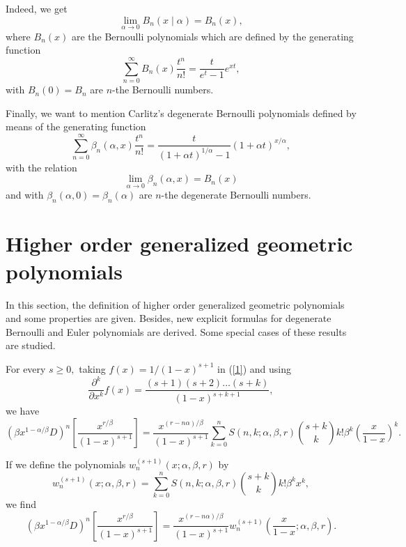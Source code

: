 \documentclass{article}%
\begin{document}
Indeed, we get%
\[
\underset{\alpha\rightarrow0}{\lim}B_{n}\left(  x\mid\alpha\right)
=B_{n}\left(  x\right)  ,
\]
where $B_{n}\left(  x\right)  $ are the Bernoulli polynomials which are
defined by the generating function%
\[
\sum_{n=0}^{\infty}B_{n}\left(  x\right)  \frac{t^{n}}{n!}=\frac{t}{e^{t}%
-1}e^{xt},
\]
with $B_{n}\left(  0\right)  =B_{n}$ are $n$-the Bernoulli numbers.

Finally, we want to mention Carlitz's degenerate Bernoulli polynomials defined
by means of the generating function \cite{Carlitz}%
\[
\sum_{n=0}^{\infty}\beta_{n}\left(  \alpha,x\right)  \frac{t^{n}}{n!}=\frac
{t}{\left(  1+\alpha t\right)  ^{1/\alpha}-1}\left(  1+\alpha t\right)
^{x/\alpha},
\]
with the relation
\[
\underset{\alpha\rightarrow0}{\lim}\beta_{n}\left(  \alpha,x\right)
=B_{n}\left(  x\right)
\]
and with $\beta_{n}\left(  \alpha,0\right)  =\beta_{n}\left(  \alpha\right)  $
are $n$-the degenerate Bernoulli numbers.

\section{Higher order generalized geometric polynomials}

In this section, the definition of higher order generalized geometric
polynomials and some properties are given. Besides, new explicit formulas for
degenerate Bernoulli and Euler polynomials are derived.\textbf{ }Some special
cases of these results are studied.

For every $s\geq0,$ taking $f\left(  x\right)  =1/\left(  1-x\right)  ^{s+1}$
in (\ref{1}) and using
\[
\frac{\partial^{k}}{\partial x^{k}}f\left(  x\right)  =\frac{\left(
s+1\right)  \left(  s+2\right)  \ldots\left(  s+k\right)  }{\left(
1-x\right)  ^{s+k+1}},
\]
we have
\[
\left(  \beta x^{1-\alpha/\beta}D\right)  ^{n}\left[  \frac{x^{r/\beta}%
}{\left(  1-x\right)  ^{s+1}}\right]  =\frac{x^{\left(  r-n\alpha\right)
/\beta}}{\left(  1-x\right)  ^{s+1}}\sum_{k=0}^{n}S\left(  n,k;\alpha
,\beta,r\right)  \binom{s+k}{k}k!\beta^{k}\left(  \frac{x}{1-x}\right)  ^{k}.
\]


If we define the polynomials $w_{n}^{\left(  s+1\right)  }\left(
x;\alpha,\beta,r\right)  $ by
\begin{equation}
w_{n}^{\left(  s+1\right)  }\left(  x;\alpha,\beta,r\right)  =\sum_{k=0}%
^{n}S\left(  n,k;\alpha,\beta,r\right)  \binom{s+k}{k}k!\beta^{k}x^{k},
\label{3}%
\end{equation}
we find
\begin{equation}
\left(  \beta x^{1-\alpha/\beta}D\right)  ^{n}\left[  \frac{x^{r/\beta}%
}{\left(  1-x\right)  ^{s+1}}\right]  =\frac{x^{\left(  r-n\alpha\right)
/\beta}}{\left(  1-x\right)  ^{s+1}}w_{n}^{\left(  s+1\right)  }\left(
\frac{x}{1-x};\alpha,\beta,r\right)  . \label{4}%
\end{equation}
\end{document}
